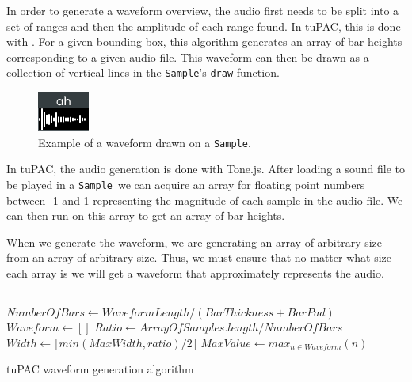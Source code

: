 \documentclass[12pt,a4paper,oneside,openright]{report}
\newcommand{\sample}{\texttt{Sample}}
\begin{document}
In order to generate a waveform overview, the audio first needs to be split into a set of ranges and then the amplitude of each range found. In tuPAC, this is done with . For a given bounding box, this algorithm generates an array of bar heights corresponding to a given audio file. This waveform can then be drawn as a collection of vertical lines in the \sample's \verb|draw| function.

\begin{figure}[h]
    \centering
    \includegraphics[scale=1.5]{images/sample.png}
    \caption{Example of a waveform drawn on a \sample.}
    \label{fig:my_label}
\end{figure}

In tuPAC, the audio generation is done with Tone.js. After loading a sound file to be played in a \sample\ we can acquire an array for floating point numbers between -1 and 1 representing the magnitude of each sample in the audio file. We can then run  on this array to get an array of bar heights.

When we generate the waveform, we are generating an array of arbitrary size from an array of arbitrary size. Thus, we must ensure that no matter what size each array is we will get a waveform that approximately represents the audio.

\begin{algorithm}[H]
\DontPrintSemicolon
{}
\vspace{1mm} \hrule \vspace{1mm}
\nl $NumberOfBars \gets WaveformLength/(BarThickness + BarPad)$\;
\nl $Waveform \gets []$\;
\nl $Ratio \gets ArrayOfSamples.length / NumberOfBars$\;
\nl $Width \gets \lfloor min(MaxWidth, ratio)/2\rfloor$\;
\nl {}
\nl $MaxValue \gets max_{n\in Waveform}(n)$\;
\nl {}
\caption{tuPAC waveform generation algorithm}\label{alg:waveform}
\end{algorithm}
\end{document}
